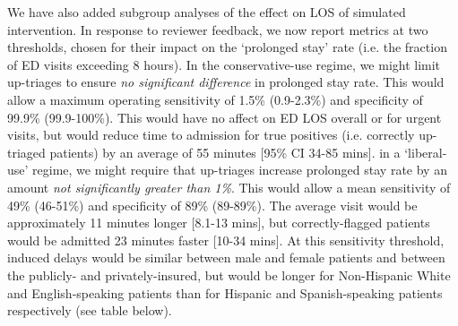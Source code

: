 We have also added subgroup analyses of the effect on LOS of simulated intervention. In response to reviewer feedback, we now report metrics at two thresholds, chosen for their impact on the `prolonged stay' rate (i.e. the fraction of ED v\textbf{}isits exceeding 8 hours). In the conservative-use regime, we might limit up-triages to ensure \textit{no significant difference} in prolonged stay rate. This would allow a maximum operating sensitivity of 1.5\% (0.9-2.3\%) and specificity of 99.9\% (99.9-100\%). This would have no affect on ED LOS overall or for urgent visits, but would reduce time to admission for true positives (i.e. correctly up-triaged patients) by an average of 55 minutes [95\% CI 34-85 mins].  in a `liberal-use' regime, we might require that up-triages increase prolonged stay rate by an amount \textit{not significantly greater than 1\%}. This would allow a mean sensitivity of 49\% (46-51\%) and specificity of 89\% (89-89\%). The average visit would be approximately 11 minutes longer [8.1-13 mins], but correctly-flagged patients would be admitted 23 minutes faster [10-34 mins]. At this sensitivity threshold, induced delays would be similar between male and female patients and between the publicly- and privately-insured, but would be longer for Non-Hispanic White and English-speaking patients than for Hispanic and Spanish-speaking patients respectively (see table below).

